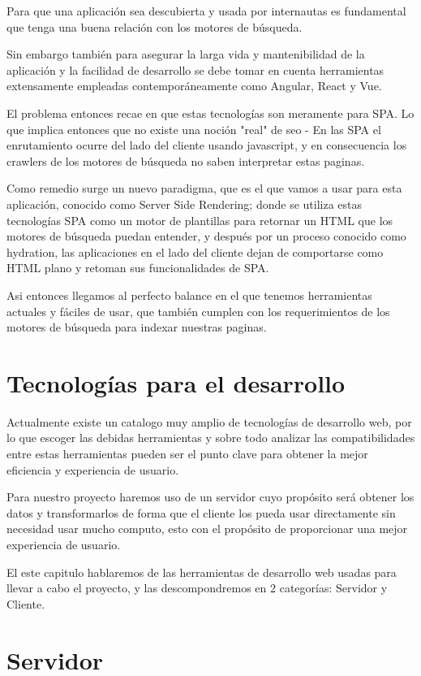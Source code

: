 Para que una aplicación sea descubierta y usada por internautas es fundamental que tenga una buena relación con los motores de búsqueda.

Sin embargo también para asegurar la larga vida y mantenibilidad de la aplicación y la facilidad de desarrollo se debe tomar en cuenta herramientas extensamente empleadas contemporáneamente como Angular, React y Vue.

El problema entonces recae en que estas tecnologías son meramente para SPA. Lo que implica entonces que no existe una noción "real" de seo - En las SPA el enrutamiento ocurre del lado del cliente usando javascript, y en consecuencia los crawlers de los motores de búsqueda no saben interpretar estas paginas.

Como remedio surge un nuevo paradigma, que es el que vamos a usar para esta aplicación, conocido como Server Side Rendering; donde se utiliza estas tecnologías SPA como un motor de plantillas para retornar un HTML que los motores de búsqueda puedan entender, y después por un proceso conocido como hydration, las aplicaciones en el lado del cliente dejan de comportarse como HTML plano y retoman sus funcionalidades de SPA.

Asi entonces llegamos al perfecto balance en el que tenemos herramientas actuales y fáciles de usar, que también cumplen con los requerimientos de los motores de búsqueda para indexar nuestras paginas.


\section{Tecnologías para el desarrollo}

Actualmente existe un catalogo muy amplio de tecnologías de desarrollo web, por lo que escoger las debidas herramientas y sobre todo analizar las compatibilidades entre estas herramientas pueden ser el punto clave para obtener la mejor eficiencia y experiencia de usuario.

Para nuestro proyecto haremos uso de un servidor cuyo propósito será obtener los datos y transformarlos de forma que el cliente los pueda usar directamente sin necesidad usar mucho computo, esto con el propósito de proporcionar una mejor experiencia de usuario.

El este capitulo hablaremos de las herramientas de desarrollo web usadas para llevar a cabo el proyecto, y las descompondremos en 2 categorías: Servidor y Cliente.

\section{Servidor}

